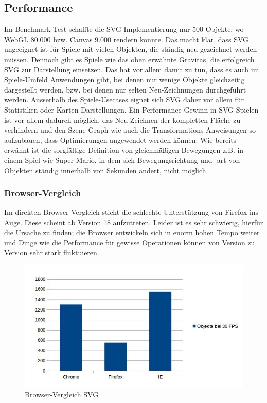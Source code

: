 \documentclass[a4paper, 12pt]{article}
\begin{document}
\subsection{Performance}
Im Benchmark-Test schaffte die SVG-Implementierung nur 500 Objekte, wo WebGL 80.000 bzw. Canvas 9.000 rendern konnte. Das macht klar, dass SVG ungeeignet ist für Spiele mit vielen Objekten, die ständig neu gezeichnet werden müssen. Dennoch gibt es Spiele wie das oben erwähnte Gravitas, die erfolgreich SVG zur Darstellung einsetzen. Das hat vor allem damit zu tun, dass es auch im Spiele-Umfeld Anwendungen gibt, bei denen nur wenige Objekte gleichzeitig dargestellt werden, bzw. bei denen nur selten Neu-Zeichnungen durchgeführt werden. Ausserhalb des Spiele-Usecases eignet sich SVG daher vor allem für Statistiken oder Karten-Darstellungen. Ein Performance-Gewinn in SVG-Spielen ist vor allem dadurch möglich, das Neu-Zeichnen der kompletten Fläche zu verhindern und den Szene-Graph wie auch die Transformations-Anweisungen so aufzubauen, dass Optimierungen angewendet werden können. Wie bereits erwähnt ist die sorgfältige Definition von gleichmäßigen Bewegungen z.B. in einem Spiel wie Super-Mario, in dem sich Bewegungsrichtung und -art von Objekten ständig innerhalb von Sekunden ändert, nicht möglich.\cite{SVGPerformance}
\subsubsection{Browser-Vergleich} Im direkten Browser-Vergleich sticht die schlechte Unterstützung von Firefox ins Auge. Diese scheint ab Version 18 aufzutreten. Leider ist es sehr schwierig, hierfür die Ursache zu finden; die Browser entwickeln sich in enorm hohen Tempo weiter und Dinge wie die Performance für gewisse Operationen können von Version zu Version sehr stark fluktuieren.\cite{SVGBrowser}
\begin{figure}[H]
	\includegraphics[width=\textwidth]{assets/browser_comp_svg} 
	\caption{Browser-Vergleich SVG}
	\label{browser_comp_svg}
\end{figure}
\newpage
\end{document}

